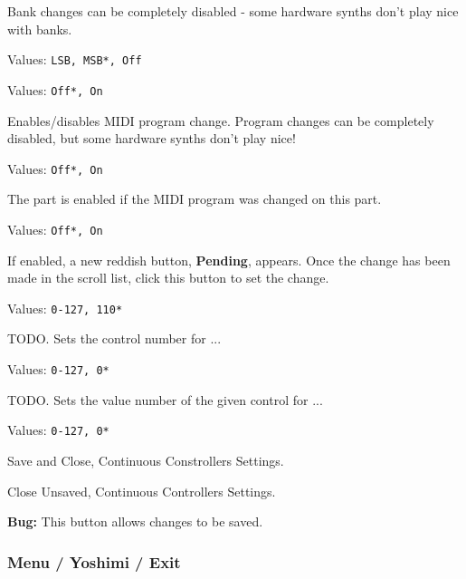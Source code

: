   Bank changes can be completely disabled - some hardware
   synths don't play nice with banks.

   Values: \texttt{LSB, MSB*, Off}


   Values: \texttt{Off*, On}

   Enables/disables MIDI program change.
   Program changes can be completely disabled, but some hardware synths don't
   play nice!


   Values: \texttt{Off*, On}

   The part is enabled if the MIDI program was changed on this part.


   Values: \texttt{Off*, On}

   If enabled, a new reddish button, \textbf{Pending}, appears.
   Once the change has been made in the scroll list, click this button
   to set the change.

   Values: \texttt{0-127, 110*}

   TODO.
   Sets the control number for ...

   Values: \texttt{0-127, 0*}

   TODO.
   Sets the value number of the given control for ...

   Values: \texttt{0-127, 0*}

   Save and Close, Continuous Constrollers Settings.

   Close Unsaved, Continuous Controllers Settings.

   \textbf{Bug:}
   This button allows changes to be saved.

\subsubsection{Menu / Yoshimi / Exit}
\label{subsubsec:menu_yoshimi_exit}

